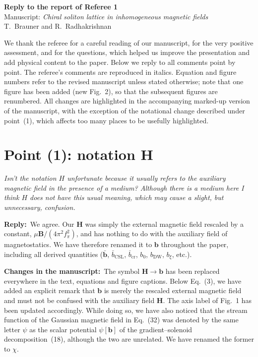 \documentclass[11pt,a4paper]{article}
\newcommand{\vek}[1]{\bm{#1}}
\newenvironment{referee}{\par\medskip\noindent\color{black!70}\itshape}{\par\medskip}
\newcommand{\reply}{\noindent\textbf{Reply:}\ }
\newcommand{\changes}{\par\smallskip\noindent\textbf{Changes in the manuscript:}\ }
\begin{document}
\begin{center}
{\Large\bfseries Reply to the report of Referee 1}\\[0.5em]
Manuscript: \emph{Chiral soliton lattice in inhomogeneous magnetic fields}\\
T.~Brauner and R.~Radhakrishnan
\end{center}

\bigskip

We thank the referee for a careful reading of our manuscript, for the very positive assessment, and for the questions, which helped us improve the presentation and add physical content to the paper. Below we reply to all comments point by point. The referee's comments are reproduced in italics. Equation and figure numbers refer to the revised manuscript unless stated otherwise; note that one figure has been added (new Fig.~2), so that the subsequent figures are renumbered. All changes are highlighted in the accompanying marked-up version of the manuscript, with the exception of the notational change described under point~(1), which affects too many places to be usefully highlighted.

\section*{Point (1): notation $\vek H$}

\begin{referee}
Isn't the notation $H$ unfortunate because it usually refers to the auxiliary magnetic field in the presence of a medium? Although there is a medium here I think $H$ does not have this usual meaning, which may cause a slight, but unnecessary, confusion.
\end{referee}

\reply We agree. Our $\vek H$ was simply the external magnetic field rescaled by a constant, $\mu\vek B/(4\pi^2f_\pi^2)$, and has nothing to do with the auxiliary field of magnetostatics. We have therefore renamed it to $\vek b$ throughout the paper, including all derived quantities ($\bar{\vek b}$, $\bar b_\text{CSL}$, $\bar b_\text{cr}$, $b_0$, $b_\text{DW}$, $b_\xi$, etc.).

\changes The symbol $\vek H\to\vek b$ has been replaced everywhere in the text, equations and figure captions. Below Eq.~(3), we have added an explicit remark that $\vek b$ is merely the rescaled external magnetic field and must not be confused with the auxiliary field $\vek H$. The axis label of Fig.~1 has been updated accordingly. While doing so, we have also noticed that the stream function of the Gaussian magnetic field in Eq.~(32) was denoted by the same letter $\psi$ as the scalar potential $\psi[\vek b]$ of the gradient--solenoid decomposition~(18), although the two are unrelated. We have renamed the former to $\chi$.
\end{document}
